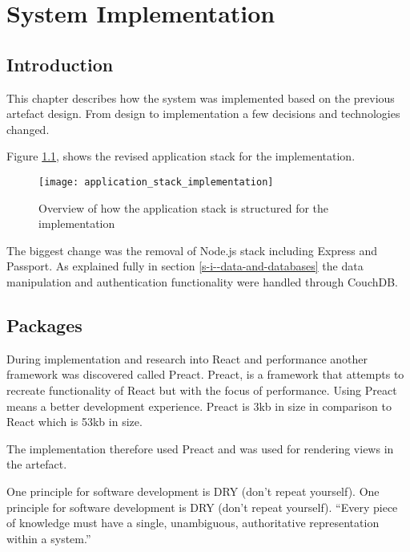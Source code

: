 \chapter{System Implementation} \label{s-i}

\section{Introduction} \label{s-i--introduction}

This chapter describes how the system was implemented based on the previous artefact design. From design to implementation a few decisions and technologies changed.

Figure \ref{figure-application-stack-implementation}, shows the revised application stack for the implementation.

\begin{figure}[H]
  \centering
    \texttt{[image: application\_stack\_implementation]}
  \caption{Overview of how the application stack is structured for the implementation}
  \label{figure-application-stack-implementation}
\end{figure}

The biggest change was the removal of Node.js stack including Express and Passport. As explained fully in section \ref{s-i--data-and-databases} the data manipulation and authentication functionality were handled through CouchDB.

\section{Packages} \label{s-i--packages}

During implementation and research into React and performance another framework was discovered called Preact. Preact, is a framework that attempts to recreate functionality of React but with the focus of performance. Using Preact means a better development experience. \cite{preact} Preact is 3kb in size in comparison to React which is 53kb in size.

The implementation therefore used Preact and was used for rendering views in the artefact.

One principle for software development is DRY (don't repeat yourself). One principle for software development is DRY (don't repeat yourself). ``Every piece of knowledge must have a single, unambiguous, authoritative representation within a system.'' \cite{DRY}

